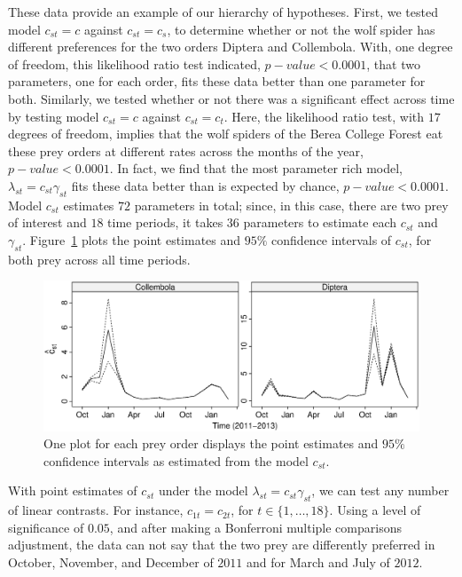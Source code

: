 These data provide an example of our hierarchy of hypotheses.  First, we tested model $c_{st} = c$ against $c_{st} = c_s$, to determine whether or not the wolf spider has different preferences for the two orders Diptera  and Collembola.  With, one degree of freedom, this likelihood ratio test indicated, $p-value < 0.0001$,  that two parameters, one for each order, fits these data better than one parameter for both.  Similarly, we tested whether or not there was a significant effect across time by testing model $c_{st} = c$ against $c_{st} = c_t$.  Here, the likelihood ratio test, with $17$ degrees of freedom, implies that the wolf spiders of the Berea College Forest eat these prey orders at different rates across the months of the year, $p-value < 0.0001$.  In fact, we find that the most parameter rich model, $\lambda_{st} = c_{st} \gamma_{st}$ fits these data better than is expected by chance, $p-value < 0.0001$.  Model $c_{st}$ estimates $72$ parameters in total; since, in this case, there are two prey of interest and $18$ time periods, it takes $36$ parameters to estimate each $c_{st}$ and $\gamma_{st}$.  Figure~\ref{fig:cst} plots the point estimates and $95\%$ confidence intervals of $c_{st}$, for both prey across all time periods.  

\begin{figure}
  \centering
  \includegraphics[scale=0.5]{cst}
  \caption{One plot for each prey order displays the point estimates and $95\%$ confidence intervals as estimated from the model $c_{st}$.}
  \label{fig:cst}
\end{figure}

With point estimates of $c_{st}$ under the model $\lambda_{st} = c_{st} \gamma_{st}$, we can test any number of linear contrasts.  For instance, $c_{1t} = c_{2t}$, for $t \in \{1, \ldots, 18\}$.  Using a level of significance of $0.05$, and after making a Bonferroni multiple comparisons adjustment, the data can not say that the two prey are differently preferred in October, November, and December of $2011$ and for March and July of $2012$.  


